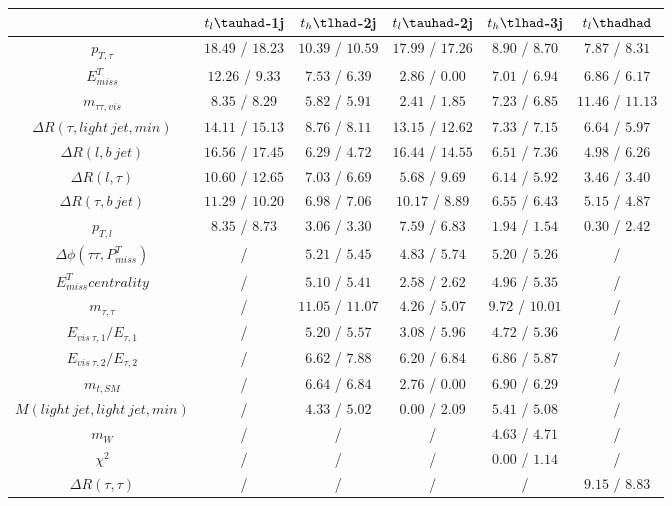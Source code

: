 \centering
\begin{tabular}{cccccc} \toprule\toprule
 & $t_{l}\tauhad$-1j & $t_{h}\tlhad$-2j & $t_{l}\tauhad$-2j & $t_{h}\tlhad$-3j & $t_l\thadhad$\\\midrule
$p_{T,\tau }$ & $18.49$ / $18.23$ & $10.39$ / $10.59$ & $17.99$ / $17.26$ & $8.90$ / $8.70$ & $7.87$ / $8.31$\\
$E^{T}_{miss}$ & $12.26$ / $9.33$ & $7.53$ / $6.39$ & $2.86$ / $0.00$ & $7.01$ / $6.94$ & $6.86$ / $6.17$\\
$m_{\tau \tau ,vis}$ & $8.35$ / $8.29$ & $5.82$ / $5.91$ & $2.41$ / $1.85$ & $7.23$ / $6.85$ & $11.46$ / $11.13$\\
$\Delta R(\tau ,light~jet,min)$ & $14.11$ / $15.13$ & $8.76$ / $8.11$ & $13.15$ / $12.62$ & $7.33$ / $7.15$ & $6.64$ / $5.97$\\
$\Delta R(l,b~jet)$ & $16.56$ / $17.45$ & $6.29$ / $4.72$ & $16.44$ / $14.55$ & $6.51$ / $7.36$ & $4.98$ / $6.26$\\
$\Delta R(l,\tau )$ & $10.60$ / $12.65$ & $7.03$ / $6.69$ & $5.68$ / $9.69$ & $6.14$ / $5.92$ & $3.46$ / $3.40$\\
$\Delta R(\tau ,b~jet)$ & $11.29$ / $10.20$ & $6.98$ / $7.06$ & $10.17$ / $8.89$ & $6.55$ / $6.43$ & $5.15$ / $4.87$\\
$p_{T,l}$ & $8.35$ / $8.73$ & $3.06$ / $3.30$ & $7.59$ / $6.83$ & $1.94$ / $1.54$ & $0.30$ / $2.42$\\
$\Delta\phi(\tau \tau ,P^{T}_{miss})$ &  / & $5.21$ / $5.45$ & $4.83$ / $5.74$ & $5.20$ / $5.26$ &  /\\
$E^{T}_{miss} centrality$ &  / & $5.10$ / $5.41$ & $2.58$ / $2.62$ & $4.96$ / $5.35$ &  /\\
$m_{\tau ,\tau }$ &  / & $11.05$ / $11.07$ & $4.26$ / $5.07$ & $9.72$ / $10.01$ &  /\\
$E_{vis~\tau ,1}/E_{\tau ,1}$ &  / & $5.20$ / $5.57$ & $3.08$ / $5.96$ & $4.72$ / $5.36$ &  /\\
$E_{vis~\tau ,2}/E_{\tau ,2}$ &  / & $6.62$ / $7.88$ & $6.20$ / $6.84$ & $6.86$ / $5.87$ &  /\\
$m_{t,SM}$ &  / & $6.64$ / $6.84$ & $2.76$ / $0.00$ & $6.90$ / $6.29$ &  /\\
$M(light~jet,light~jet,min)$ &  / & $4.33$ / $5.02$ & $0.00$ / $2.09$ & $5.41$ / $5.08$ &  /\\
$m_{W}$ &  / &  / &  / & $4.63$ / $4.71$ &  /\\
$\chi^{2}$ &  / &  / &  / & $0.00$ / $1.14$ &  /\\
$\Delta R(\tau ,\tau )$ &  / &  / &  / &  / & $9.15$ / $8.83$\\

\end{tabular}
